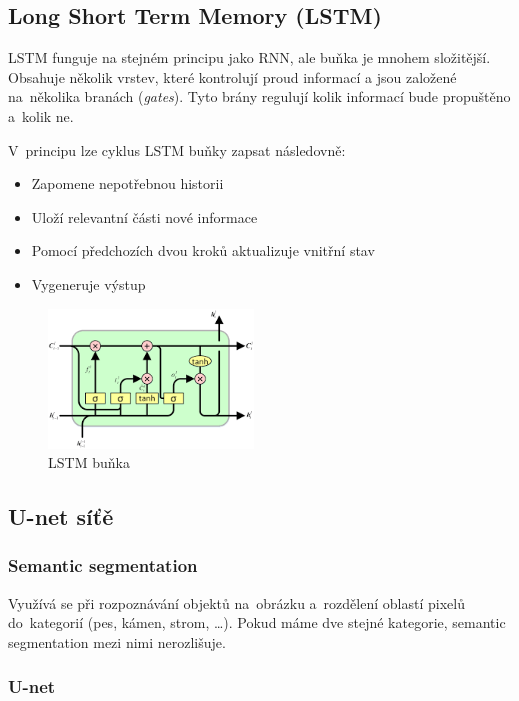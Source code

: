 \subsection{Long Short Term Memory (LSTM)}

LSTM funguje na stejném principu jako RNN, ale buňka je mnohem složitější.
Obsahuje několik vrstev, které kontrolují proud informací a jsou založené na~několika branách (\emph{gates}).
Tyto brány regulují kolik informací bude propuštěno a~kolik ne.

V~principu lze cyklus LSTM buňky zapsat následovně:
\begin{itemize}
	\item Zapomene nepotřebnou historii
	\item Uloží relevantní části nové informace
	\item Pomocí předchozích dvou kroků aktualizuje vnitřní stav
	\item Vygeneruje výstup
\end{itemize}

\begin{figure}[h]
    \centering
	\includegraphics[height=10em]{images/09_lstm.png}
    \caption{LSTM buňka}
    \label{LSTM}
\end{figure}
\FloatBarrier

\subsection{U-net síťě}

\subsubsection{Semantic segmentation}

Využívá se při rozpoznávání objektů na~obrázku a~rozdělení oblastí pixelů do~kategorií (pes, kámen, strom, \dots).
Pokud máme dve stejné kategorie, semantic segmentation mezi nimi nerozlišuje.

\subsubsection{U-net}

